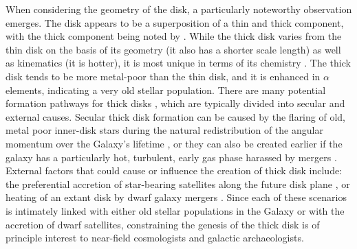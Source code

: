 When considering the geometry of the disk, a particularly noteworthy observation emerges. The disk appears to be a superposition of a thin and thick component, with the thick component being noted by \textcite{gilmore83}. While the thick disk varies from the thin disk on the basis of its geometry (it also has a shorter scale length) as well as kinematics (it is hotter), it is most unique in terms of its chemistry \parencite{gilmore95,bensby14}. The thick disk tends to be more metal-poor than the thin disk, and it is enhanced in $\alpha$ elements, indicating a very old stellar population. There are many potential formation pathways for thick disks \parencite[e.g. see][]{robin14,minchev15}, which are typically divided into secular and external causes. Secular thick disk formation can be caused by the flaring of old, metal poor inner-disk stars during the natural redistribution of the angular momentum over the Galaxy's lifetime \parencite{schoenrich09}, or they can also be created earlier if the galaxy has a particularly hot, turbulent, early gas phase harassed by mergers \parencite{brook04}. External factors that could cause or influence the creation of thick disk include: the preferential accretion of star-bearing satellites along the future disk plane \parencite{abadi03}, or heating of an extant disk by dwarf galaxy mergers \parencite{quinn93}. Since each of these scenarios is intimately linked with either old stellar populations in the Galaxy or with the accretion of dwarf satellites, constraining the genesis of the thick disk is of principle interest to near-field cosmologists and galactic archaeologists.

